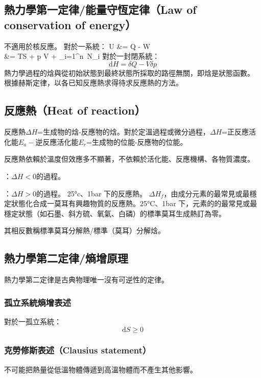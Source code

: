\documentclass[a4paper,12pt]{report}
\begin{document}
\subsection{熱力學第一定律/能量守恆定律（Law of conservation of energy）}
不適用於核反應。
對於一系統：
\bma
{}U &= \delta Q - \delta W\\
&= TS + p \delta V + \sum _{i=1}^{n}\, N_i
\eam
{}
對於一封閉系統：
\[\mathrm{d}H = \delta Q - V\delta p \]
熱力學過程的焓與從初始狀態到最終狀態所採取的路徑無關，即焓是狀態函數。
根據赫斯定律，以各已知反應熱求得待求反應熱的方法。
\subsection{反應熱（Heat of reaction）}
反應熱$\Delta H$=生成物的焓-反應物的焓。對於定溫過程或微分過程，$\Delta H$=正反應活化能$E_a-$逆反應活化能$E_r$=生成物的位能-反應物的位能。

反應熱依賴於溫度但效應多不顯著，不依賴於活化能、反應機構、各物質濃度。

\bit
\item {}：$\Delta H<0$的過程。
\item {}：$\Delta H>0$的過程。
\eit
{}
25°c、1bar 下的反應熱。
$\Delta H_f$，由成分元素的最常見或最穩定狀態化合成一莫耳有興趣物質的反應熱。25°C、1bar 下，元素的的最常見或最穩定狀態（如石墨、斜方硫、氧氣、白磷）的標準莫耳生成熱訂為零。

其相反數稱標準莫耳分解熱/標準（莫耳）分解焓。
\subsection{熱力學第二定律/熵增原理}
熱力學第二定律是古典物理唯一沒有可逆性的定律。
\subsubsection{孤立系統熵增表述}
對於一孤立系統：
\[\mathrm{d}S \geq 0\]
\subsubsection{克勞修斯表述（Clausius statement）}
不可能把熱量從低溫物體傳遞到高溫物體而不產生其他影響。
\end{document}
